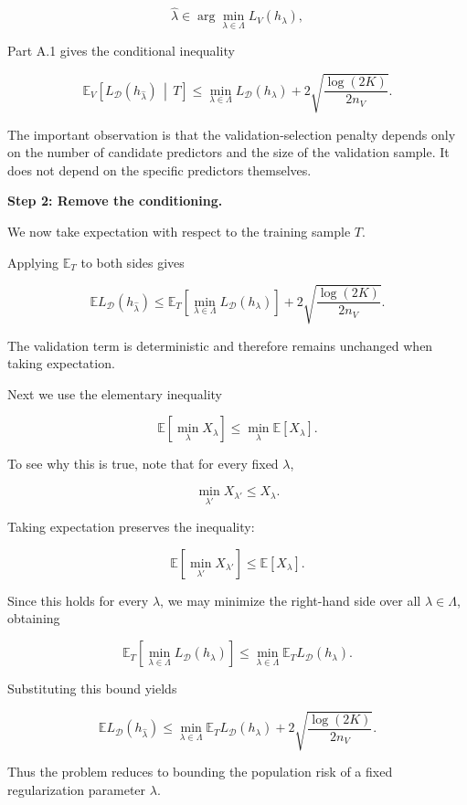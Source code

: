 \documentclass[11pt]{article}
\begin{document}
\begin{enumerate}
\begin{solutionbox}
\[
\widehat{\lambda}
\in
\arg\min_{\lambda\in\Lambda}
L_V(h_\lambda),
\]

Part A.1 gives the conditional inequality

\[
\mathbb E_V
\!\left[
L_{\mathcal D}(h_{\widehat{\lambda}})
\,\middle|\,
T
\right]
\le
\min_{\lambda\in\Lambda}
L_{\mathcal D}(h_\lambda)
+
2\sqrt{
\frac{\log(2K)}
{2n_V}
}.
\]

The important observation is that the validation-selection penalty depends only on the number of candidate predictors and the size of the validation sample. It does not depend on the specific predictors themselves.

\medskip

\textbf{Step 2: Remove the conditioning.}

We now take expectation with respect to the training sample $T$.

Applying $\mathbb E_T$ to both sides gives

\[
\mathbb E
L_{\mathcal D}(h_{\widehat{\lambda}})
\le
\mathbb E_T
\left[
\min_{\lambda\in\Lambda}
L_{\mathcal D}(h_\lambda)
\right]
+
2\sqrt{
\frac{\log(2K)}
{2n_V}
}.
\]

The validation term is deterministic and therefore remains unchanged when taking expectation.

Next we use the elementary inequality

\[
\mathbb E
\!\left[
\min_{\lambda}X_\lambda
\right]
\le
\min_{\lambda}
\mathbb E[X_\lambda].
\]

To see why this is true, note that for every fixed $\lambda$,

\[
\min_{\lambda'}X_{\lambda'}
\le
X_\lambda.
\]

Taking expectation preserves the inequality:

\[
\mathbb E
\!\left[
\min_{\lambda'}X_{\lambda'}
\right]
\le
\mathbb E[X_\lambda].
\]

Since this holds for every $\lambda$, we may minimize the right-hand side over all $\lambda\in\Lambda$, obtaining

\[
\mathbb E_T
\left[
\min_{\lambda\in\Lambda}
L_{\mathcal D}(h_\lambda)
\right]
\le
\min_{\lambda\in\Lambda}
\mathbb E_T
L_{\mathcal D}(h_\lambda).
\]

Substituting this bound yields

\[
\mathbb E
L_{\mathcal D}(h_{\widehat{\lambda}})
\le
\min_{\lambda\in\Lambda}
\mathbb E_T
L_{\mathcal D}(h_\lambda)
+
2\sqrt{
\frac{\log(2K)}
{2n_V}
}.
\]

Thus the problem reduces to bounding the population risk of a fixed regularization parameter $\lambda$.


\end{solutionbox}
\end{enumerate}
\end{document}
